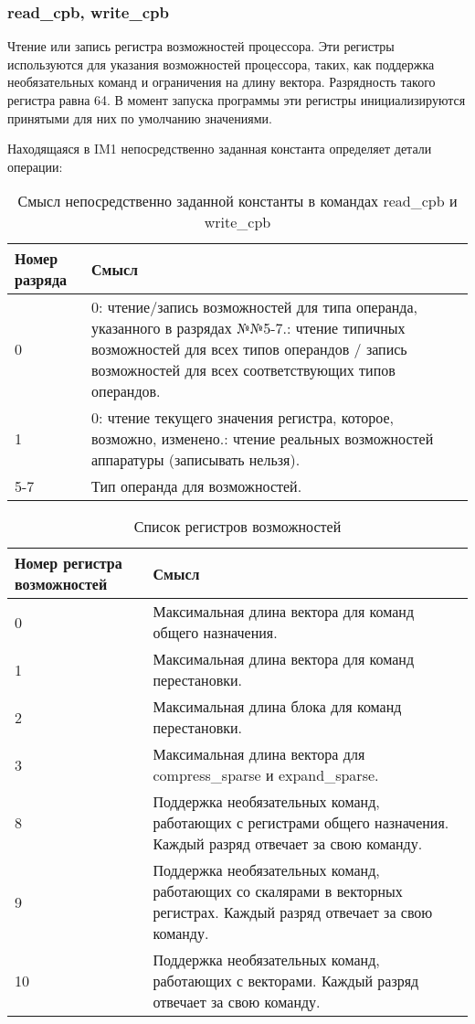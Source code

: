 \documentclass[forwardcom.tex]{subfiles}
\begin{document}
\subsubsection{read\_cpb, write\_cpb}
Чтение или запись регистра возможностей процессора. Эти регистры используются для указания возможностей процессора, таких, как поддержка необязательных команд и ограничения на длину вектора. Разрядность такого регистра равна 64. В момент запуска программы эти регистры инициализируются принятыми для них по умолчанию значениями.

Находящаяся в IM1 непосредственно заданная константа определяет детали операции:

\begin{longtable} {|p{20mm}|p{128mm}|}
\caption{Смысл непосредственно заданной константы в командах read\_cpb и write\_cpb} 
\label{table:readWriteCpbModes} \\
\endfirsthead
\endhead
\hline
\bfseries Номер разряда & \bfseries Смысл  \\ \hline
0                       &  0: чтение/запись возможностей для типа операнда, указанного в разрядах №№5-7.\newline
                           1: чтение типичных возможностей для всех типов операндов / запись возможностей для всех соответствующих типов операндов.  \\ \hline
1                       &  0: чтение текущего значения регистра, которое, возможно, изменено.\newline
                           1: чтение реальных возможностей аппаратуры (записывать нельзя). \\ \hline
5-7                     & Тип операнда для возможностей. \\ \hline
\end{longtable}

\begin{longtable} {|p{20mm}|p{110mm}|}
\caption{Список регистров возможностей} 
\label{table:capabilitiesRegisters} \\
\endfirsthead
\endhead
\hline
\bfseries Номер регистра возможностей & \bfseries Смысл  \\ \hline
0  &  Максимальная длина вектора для команд общего назначения. \\ \hline
1  &  Максимальная длина вектора для команд перестановки. \\ \hline
2  &  Максимальная длина блока для команд перестановки. \\ \hline
3  &  Максимальная длина вектора для compress\_sparse и expand\_sparse. \\ \hline
8  &  Поддержка необязательных команд, работающих с регистрами общего назначения. Каждый разряд отвечает за свою команду. \\ \hline
9  &  Поддержка необязательных команд, работающих со скалярами в векторных регистрах. Каждый разряд отвечает за свою команду.  \\ \hline
10 &  Поддержка необязательных команд, работающих с векторами. Каждый разряд отвечает за свою команду.  \\ \hline
\end{longtable}
\end{document}
